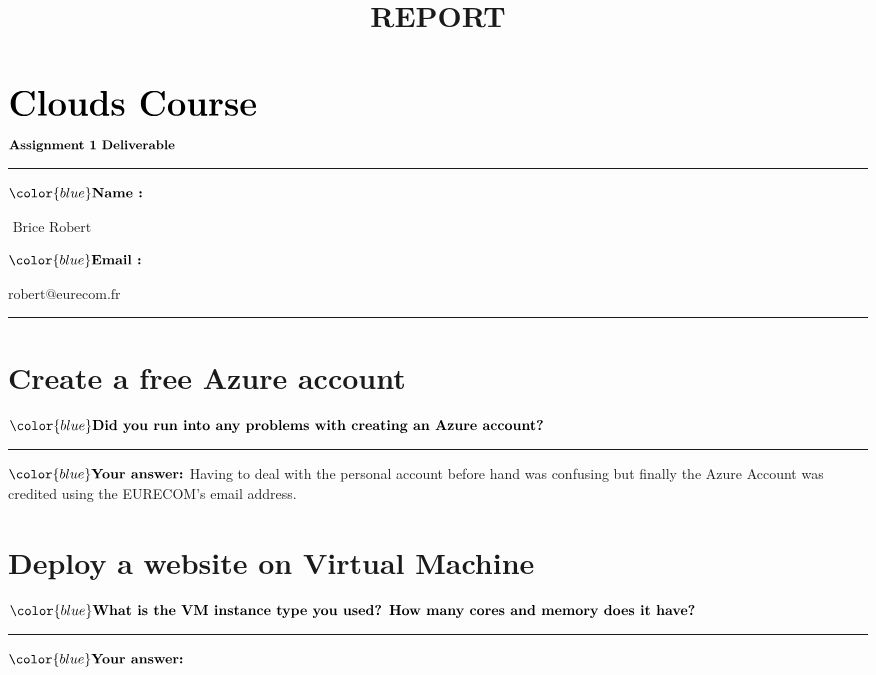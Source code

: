 \documentclass[11pt]{article}
\title{REPORT}
\begin{document}
    
    \maketitle
    
    

    
    \(\Huge{\textbf{Clouds Course}}\)

\(\small{\textbf{Assignment 1 Deliverable}}\)

    \begin{center}\rule{0.5\linewidth}{0.5pt}\end{center}

\(\color{blue}\textbf{Name :}\)

\(\boxed{\text{        Brice Robert          }}\)

\(\color{blue}\textbf{Email :}\)

\(\boxed{\text{robert@eurecom.fr}}\)

\begin{center}\rule{0.5\linewidth}{0.5pt}\end{center}

    \section{Create a free Azure account}\label{create-a-free-azure-account}

    \(\color{blue}\textbf{Did you run into any problems with creating an Azure account?}\)

\begin{center}\rule{0.5\linewidth}{0.5pt}\end{center}

\(\color{blue} \textbf{Your answer:}\) Having to deal with the personal
account before hand was confusing but finally the Azure Account was
credited using the EURECOM's email address.

    \section{Deploy a website on Virtual
Machine}\label{deploy-a-website-on-virtual-machine}

    \(\color{blue}\textbf{What is the VM instance type you used? How many cores and memory does it have?}\)

\begin{center}\rule{0.5\linewidth}{0.5pt}\end{center}

\(\color{blue} \textbf{Your answer:}\)
\end{document}
